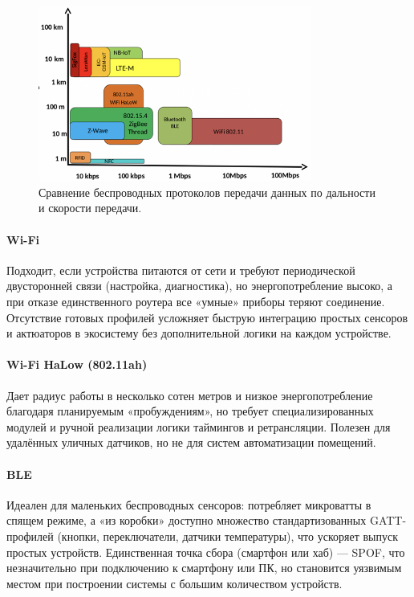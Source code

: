 \documentclass[14pt,a4paper]{extarticle}
\begin{document}
\begin{figure}[h]
    \centering
    \includegraphics[width=0.8\textwidth]{images/Fig07.png}
    \captionsetup{justification=centering}
    \caption{Сравнение беспроводных протоколов передачи данных по дальности и скорости передачи. \cite{IMG_protocol_compare} }
    \label{fig:protocols_range_vs_speed}
\end{figure}


\paragraph{Wi-Fi}
Подходит, если устройства питаются от сети и требуют периодической двусторонней связи (настройка, диагностика), но энергопотребление высоко, а при отказе единственного роутера все «умные» приборы теряют соединение. Отсутствие готовых профилей усложняет быструю интеграцию простых сенсоров и актюаторов в экосистему без дополнительной логики на каждом устройстве.

\paragraph{Wi-Fi HaLow (802.11ah)}
Дает радиус работы в несколько сотен метров и низкое энергопотребление благодаря планируемым «пробуждениям», но требует специализированных модулей и ручной реализации логики таймингов и ретрансляции. Полезен для удалённых уличных датчиков, но не для систем автоматизации помещений.

\paragraph{BLE}
Идеален для маленьких беспроводных сенсоров: потребляет микроватты в спящем режиме, а «из коробки» доступно множество стандартизованных GATT-профилей (кнопки, переключатели, датчики температуры), что ускоряет выпуск простых устройств. Единственная точка сбора (смартфон или хаб) — SPOF, что незначительно при подключению к смартфону или ПК, но становится уязвимым местом при построении системы с большим количеством устройств.
\end{document}
